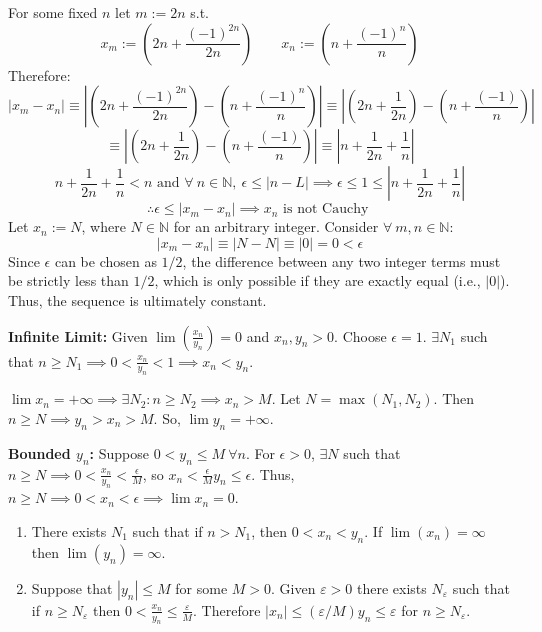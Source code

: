 	For some fixed $n$ let $m := 2n$ s.t.
	\[
		x_m := \left( 2n + \frac{(-1)^{2n}}{2n} \right)
		\quad \quad
		x_n := \left( n + \frac{(-1)^n}{n} \right)
	\]
	Therefore:
	\[
		|x_m - x_n| \equiv
		\left| \left( 2n + \frac{(-1)^{2n}}{2n} \right) - \left( n + \frac{(-1)^n}{n} \right)  \right|
		\equiv
		\left| \left( 2n + \frac{1}{2n} \right) - \left( n + \frac{(-1)}{n} \right)  \right|
	\]
	\[
		\equiv
		\left| \left( 2n + \frac{1}{2n} \right) - \left( n + \frac{(-1)}{n} \right)  \right|
		\equiv
		\left|  n + \frac{1}{2n}  +  \frac{1}{n}   \right|
	\]
	\[
		n + \frac{1}{2n}  +  \frac{1}{n} < n \text{ and } \forall~ n \in  \mathbb{N}, ~\epsilon \leq |n - L| \implies \epsilon \leq 1 \leq  \left|  n + \frac{1}{2n}  +  \frac{1}{n}   \right|
	\]
	\[
		\therefore \epsilon \leq |x_m - x_n| \implies  x_n \text{ is not Cauchy }
	\]
	Let $x_n := N$, where $N \in \mathbb{N}$ for an arbitrary integer.
	Consider $\forall~ m,n \in \mathbb{N}$:
	\[
		|x_m - x_n| \equiv |N - N| \equiv |0| = 0 < \epsilon
	\]
	Since $\epsilon$ can be chosen as $1/2$, the difference between any two integer terms must be strictly less than $1/2$, which is only possible if they are exactly equal (i.e., $|0|$). Thus, the sequence is ultimately constant.


\textbf{Infinite Limit:}
Given $\lim\left(\frac{x_n}{y_n}\right) = 0$ and $x_n, y_n > 0$.
Choose $\epsilon = 1$. $\exists N_1$ such that $n \ge N_1 \implies 0 < \frac{x_n}{y_n} < 1 \implies x_n < y_n$.

$\lim x_n = +\infty \implies \exists N_2 : n \ge N_2 \implies x_n > M$. Let $N = \max(N_1, N_2)$. Then $n \ge N \implies y_n > x_n > M$. So, $\lim y_n = +\infty$.

\textbf{Bounded $y_n$:}
Suppose $0 < y_n \le M\ \forall n$. For $\epsilon > 0$, $\exists N$ such that $n \ge N \implies 0 < \frac{x_n}{y_n} < \frac{\epsilon}{M}$, so $x_n < \frac{\epsilon}{M}y_n \le \epsilon$. Thus, $n \ge N \implies 0 < x_n < \epsilon \implies \lim x_n = 0$.


\begin{enumerate}
    \item[(a)] There exists $N_1$ such that if $n > N_1$, then $0 < x_n < y_n$. If $\lim(x_n) = \infty$ then $\lim(y_n) = \infty$.
    \item[(b)] Suppose that $|y_n| \leq M$ for some $M > 0$. Given $\varepsilon > 0$ there exists $N_{\varepsilon}$ such that if $n \geq N_{\varepsilon}$ then $0 < \frac{x_n}{y_n} \leq \frac{\varepsilon}{M}$. Therefore $|x_n| \leq (\varepsilon/M)y_n \leq \varepsilon$ for $n \geq N_{\varepsilon}$.
\end{enumerate}

